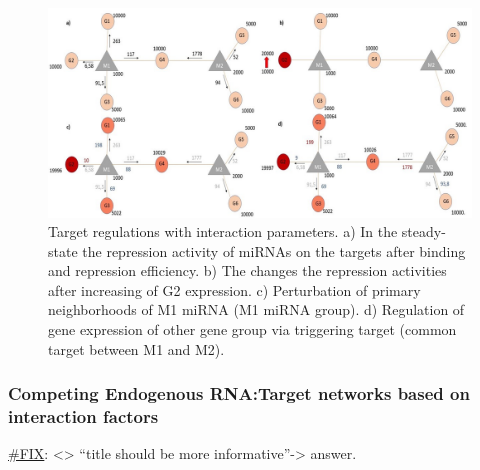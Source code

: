 \documentclass[]{article}
\begin{document}
\begin{figure}
\hypertarget{fig3}{%
\centering
\includegraphics{Fig3.jpg}
\caption{Target regulations with interaction parameters. a) In the
steady-state the repression activity of miRNAs on the targets after
binding and repression efficiency. b) The changes the repression
activities after increasing of G2 expression. c) Perturbation of primary
neighborhoods of M1 miRNA (M1 miRNA group). d) Regulation of gene
expression of other gene group via triggering target (common target
between M1 and M2).}\label{fig3}
}
\end{figure}

\hypertarget{competing-endogenous-rnatarget-networks-based-on-interaction-factors}{%
\subsubsection{Competing Endogenous RNA:Target networks based on
interaction
factors}\label{competing-endogenous-rnatarget-networks-based-on-interaction-factors}}

\href{}{\#FIX}: \textless{}\textgreater{} ``title should be more
informative''-\textgreater{} answer.
\end{document}
